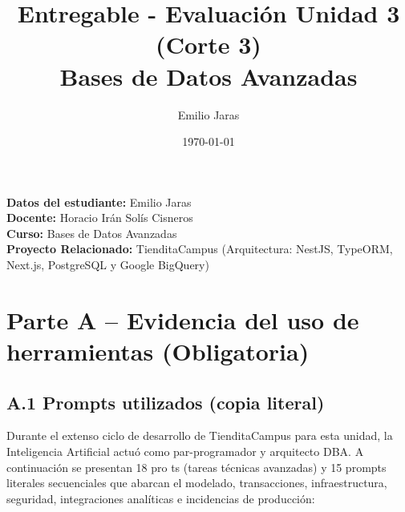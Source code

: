 \documentclass[12pt,a4paper]{article}
\title{\textbf{Entregable - Evaluación Unidad 3 (Corte 3)}\\[0.5cm]\large Bases de Datos Avanzadas}
\author{Emilio Jaras}
\date{\today}
\begin{document}
\maketitle
\vspace{-1.5cm}
\noindent \textbf{Datos del estudiante:} Emilio Jaras \\
\textbf{Docente:} Horacio Irán Solís Cisneros \\
\textbf{Curso:} Bases de Datos Avanzadas \\
\textbf{Proyecto Relacionado:} TienditaCampus (Arquitectura: NestJS, TypeORM, Next.js, PostgreSQL y Google BigQuery)

\tableofcontents
\newpage

\section{Parte A – Evidencia del uso de herramientas (Obligatoria)}

\subsection{A.1 Prompts utilizados (copia literal)}

Durante el extenso ciclo de desarrollo de TienditaCampus para esta unidad, la Inteligencia Artificial actuó como par-programador y arquitecto DBA. A continuación se presentan 18 pro ts (tareas técnicas avanzadas) y 15 prompts literales secuenciales que abarcan el modelado, transacciones, infraestructura, seguridad, integraciones analíticas e incidencias de producción:
\end{document}
